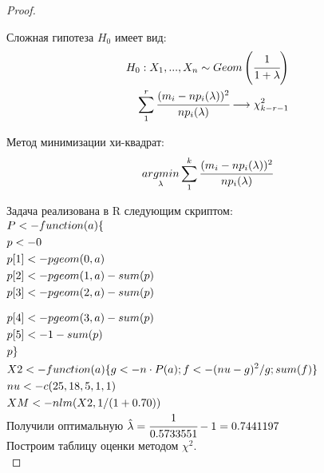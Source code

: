 \begin{proof}
	$ $
	
	Сложная гипотеза $H_0$ имеет вид:
	\begin{align}
		H_0: X_1, ..., X_n \sim Geom\left(\cfrac{1}{1+\lambda}\right) \\
		\sum\limits_1^r\cfrac{(m_i-np_i(\lambda))^2}{np_i(\lambda)}\longrightarrow\chi^2_{k-r-1}
	\end{align}	
	
	Метод минимизации хи-квадрат:
	\begin{equation}
		\underset{\lambda}{argmin}\sum\limits_1^k\cfrac{(m_i-np_i(\lambda))^2}{np_i(\lambda)}
	\end{equation}
	
	Задача реализована в R следующим скриптом: \\
	
	$\begin{gathered}
		P <- function(a)\{ \hfill \\
		p <- 0 \hfill \\
		p[1] <- pgeom(0, a) \hfill \\
		p[2] <- pgeom(1, a) - sum(p) \hfill \\
		p[3] <- pgeom(2, a) - sum(p) \hfill \\
	\end{gathered}$

	$\begin{gathered}
		p[4] <- pgeom(3, a) - sum(p)\ \hfill \\
		p[5] <- 1-sum(p) \hfill \\
		p\} \hfill \\
		X2 <- function(a)\{g <- n\cdot P(a); f <- (nu-g)^2/g; sum(f)\} \hfill \\
		nu <- c(25, 18, 5, 1, 1) \hfill \\
		XM <- nlm(X2, 1/(1+0.70)) \hfill \\
	\end{gathered}$ \\

	Получили оптимальную $\hat{\lambda}=\cfrac1{0.5733551}-1=0.7441197$ \\
	
	Построим таблицу оценки методом $\chi^2$. \\


\end{proof}
